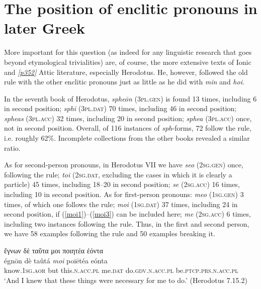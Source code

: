 \section{The position of enclitic pronouns in later Greek}\label{enclitic-later}

More important for this question (as indeed for any linguistic research that goes beyond etymological trivialities) are, of course, the more extensive texts of Ionic and \hyperlink{p352}{\emph{[p352]}} Attic literature, especially Herodotus. He, however, followed the old rule with the other enclitic pronouns just as little as he did with \textit{min} and \textit{hoi}.

In the seventh book of Herodotus, \textit{spheōn} (\textsc{3pl.gen}) is found 13 times, including 6 in second position; \textit{sphi} (\textsc{3pl.dat}) 70 times, including 46 in second position; \textit{spheas} (\textsc{3pl.acc}) 32 times, including 20 in second position; \textit{sphea} (\textsc{3pl.acc}) once, not in second position. Overall, of 116 instances of \textit{sph}-forms, 72 follow the rule, i.e. roughly 62\%. Incomplete collections from the other books revealed a similar ratio.

As for second-person pronouns, in Herodotus VII we have \textit{seo} (\textsc{2sg.gen}) once, following the rule; \textit{toi} (\textsc{2sg.dat}, excluding the cases in which it is clearly a particle) 45 times, including 18--20 in second position; \textit{se} (\textsc{2sg.acc}) 16 times, including 10 in second position. As for first-person pronouns: \textit{meo} (\textsc{1sg.gen}) 3 times, of which one follows the rule; \textit{moi} (\textsc{1sg.dat}) 37 times, including 24 in second position, if (\ref{moi1})--(\ref{moi3}) can be included here; \textit{me} (\textsc{2sg.acc}) 6 times, including two instances following the rule. Thus, in the first and second person, we have 58 examples following the rule and 50 examples breaking it.

\begin{exe}
\ex ἔγνων δὲ ταῦτα μοι ποιητέα ἐόντα\\
\gll égnōn dè taûtá \emph{moi} poiētéa eónta\\
know.\textsc{1sg.aor} but this.\textsc{n.acc.pl} me.\textsc{dat} do.\textsc{gdv.n.acc.pl} be.\textsc{ptcp.prs.n.acc.pl}\\
\trans `And I knew that these things were necessary for me to do.' (Herodotus 7.15.2)
\label{moi1}
\end{exe}

